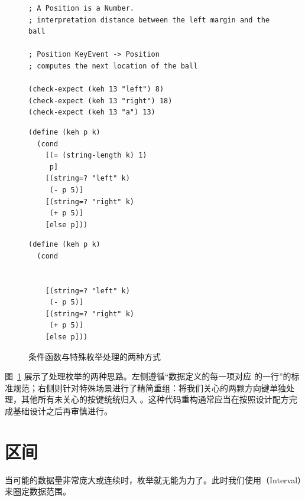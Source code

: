 \begin{figure}[htbp]
  \centering
\begin{stepperbox}[unbreakable]
\begin{Verbatim}[fontsize=\fontsize{6.0pt}{7.2pt}\selectfont]
; A Position is a Number.
; interpretation distance between the left margin and the ball

; Position KeyEvent -> Position
; computes the next location of the ball

(check-expect (keh 13 "left") 8)
(check-expect (keh 13 "right") 18)
(check-expect (keh 13 "a") 13)
\end{Verbatim}
\noindent\begin{minipage}[t]{0.48\linewidth}
\begin{Verbatim}[fontsize=\fontsize{6.0pt}{7.2pt}\selectfont]
(define (keh p k)
  (cond
    [(= (string-length k) 1)
     p]
    [(string=? "left" k)
     (- p 5)]
    [(string=? "right" k)
     (+ p 5)]
    [else p]))
\end{Verbatim}
\end{minipage}%
\hfill
\begin{minipage}[t]{0.48\linewidth}
\begin{Verbatim}[fontsize=\fontsize{6.0pt}{7.2pt}\selectfont]
(define (keh p k)
  (cond


    [(string=? "left" k)
     (- p 5)]
    [(string=? "right" k)
     (+ p 5)]
    [else p]))
\end{Verbatim}
\end{minipage}
\end{stepperbox}
  \caption{条件函数与特殊枚举处理的两种方式}
  \label{fig:deal_with_keys_compare}
\end{figure}

图~\ref{fig:deal_with_keys_compare} 展示了处理枚举的两种思路。左侧遵循“数据定义的每一项对应  的一行”的标准规范；右侧则针对特殊场景进行了精简重组：将我们关心的两颗方向键单独处理，其他所有未关心的按键统统归入 。这种代码重构通常应当在按照设计配方完成基础设计之后再审慎进行。

\section{区间}
\label{sec:4.4_intervals}

当可能的数据量非常庞大或连续时，枚举就无能为力了。此时我们使用（Interval）来圈定数据范围。


